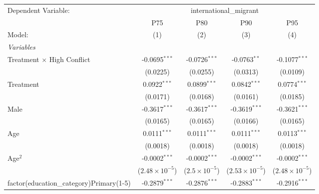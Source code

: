 
\begingroup
\centering
\begin{tabular}{lcccc}
   \tabularnewline \midrule \midrule
   Dependent Variable: & \multicolumn{4}{c}{international\_migrant}\\
                                               & P75                     & P80                    & P90                     & P95 \\   
   Model:                                      & (1)                     & (2)                    & (3)                     & (4)\\  
   \midrule
   \emph{Variables}\\
   Treatment $\times$ High Conflict            & -0.0695$^{***}$         & -0.0726$^{***}$        & -0.0763$^{**}$          & -0.1077$^{***}$\\   
                                               & (0.0225)                & (0.0255)               & (0.0313)                & (0.0109)\\   
   Treatment                                   & 0.0922$^{***}$          & 0.0899$^{***}$         & 0.0842$^{***}$          & 0.0774$^{***}$\\   
                                               & (0.0171)                & (0.0168)               & (0.0161)                & (0.0185)\\   
   Male                                        & -0.3617$^{***}$         & -0.3617$^{***}$        & -0.3619$^{***}$         & -0.3621$^{***}$\\   
                                               & (0.0165)                & (0.0165)               & (0.0166)                & (0.0165)\\   
   Age                                         & 0.0111$^{***}$          & 0.0111$^{***}$         & 0.0111$^{***}$          & 0.0113$^{***}$\\   
                                               & (0.0018)                & (0.0018)               & (0.0018)                & (0.0018)\\   
   Age$^2$                                     & -0.0002$^{***}$         & -0.0002$^{***}$        & -0.0002$^{***}$         & -0.0002$^{***}$\\   
                                               & ($2.48\times 10^{-5}$)  & ($2.5\times 10^{-5}$)  & ($2.53\times 10^{-5}$)  & ($2.48\times 10^{-5}$)\\    
   factor(education\_category)Primary(1-5)     & -0.2879$^{***}$         & -0.2876$^{***}$        & -0.2883$^{***}$         & -0.2916$^{***}$\\   

\end{tabular}
